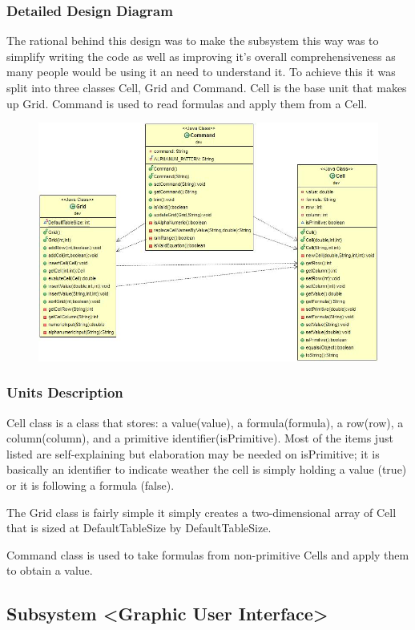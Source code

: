 \documentclass[12pt]{article}
\begin{document}
\subsubsection{Detailed Design Diagram}
The rational behind this design was to make the subsystem this way was to simplify writing the code as well as improving it's overall comprehensiveness as many people would be using it an need to understand it. To achieve this it was split into three classes Cell, Grid and Command. Cell is the base unit that makes up Grid. Command is used to read formulas and apply them from a Cell.
\begin{figure}[ht!]
\centering
\includegraphics[width=165mm]{SS1_Spreadsheet.jpg}
\end{figure}

\subsubsection{Units Description}
Cell class is a class that stores: a value(value), a formula(formula), a row(row), a column(column), and a primitive identifier(isPrimitive). Most of the items just listed are self-explaining but elaboration may be needed on isPrimitive; it is basically an identifier to indicate weather the cell is simply holding a value (true) or it is following a formula (false).

The Grid class is fairly simple it simply creates a two-dimensional array of Cell that is sized at DefaultTableSize by DefaultTableSize.

Command class is used to take formulas from non-primitive Cells and apply them to obtain a value.


\subsection{Subsystem \textless Graphic User Interface\textgreater}
\end{document}
